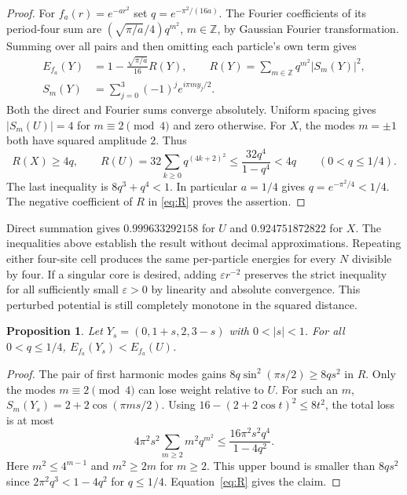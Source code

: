 \documentclass[11pt]{article}
\newtheorem{proposition}[theorem]{Proposition}
\newcommand{\Z}{\mathbb Z}
\begin{document}
\begin{proof}
For $f_a(r)=e^{-ar^2}$ set $q=e^{-\pi^2/(16a)}$. The Fourier coefficients of its period-four sum are $(\sqrt{\pi/a}/4)q^{m^2}$, $m\in\Z$, by Gaussian Fourier transformation. Summing over all pairs and then omitting each particle's own term gives
\begin{align}
 E_{f_a}(Y)&=1-\frac{\sqrt{\pi/a}}{16}R(Y),\qquad
 R(Y)=\sum_{m\in\Z}q^{m^2}|S_m(Y)|^2,\label{eq:R}\\
 S_m(Y)&=\sum_{j=0}^3(-1)^j e^{i\pi m y_j/2}.\nonumber
\end{align}
Both the direct and Fourier sums converge absolutely. Uniform spacing gives $|S_m(U)|=4$ for $m\equiv2\pmod4$ and zero otherwise. For $X$, the modes $m=\pm1$ both have squared amplitude $2$. Thus
\[
 R(X)\ge4q,\qquad R(U)=32\sum_{k\ge0}q^{(4k+2)^2}
          \le\frac{32q^4}{1-q^4}<4q\qquad(0<q\le1/4).
\]
The last inequality is $8q^3+q^4<1$. In particular $a=1/4$ gives $q=e^{-\pi^2/4}<1/4$. The negative coefficient of $R$ in \eqref{eq:R} proves the assertion.
\end{proof}

Direct summation gives $0.999633292158$ for $U$ and $0.924751872822$ for $X$. The inequalities above establish the result without decimal approximations. Repeating either four-site cell produces the same per-particle energies for every $N$ divisible by four. If a singular core is desired, adding $\varepsilon r^{-2}$ preserves the strict inequality for all sufficiently small $\varepsilon>0$ by linearity and absolute convergence. This perturbed potential is still completely monotone in the squared distance.

\begin{proposition}\label{prop:instability}
Let $Y_s=(0,1+s,2,3-s)$ with $0<|s|<1$. For all $0<q\le1/4$, $E_{f_a}(Y_s)<E_{f_a}(U)$.
\end{proposition}
\begin{proof}
The pair of first harmonic modes gains $8q\sin^2(\pi s/2)\ge8q s^2$ in $R$. Only the modes $m\equiv 2\pmod4$ can lose weight relative to $U$. For such an $m$, $S_m(Y_s)=2+2\cos(\pi ms/2)$. Using $16-(2+2\cos t)^2\le8t^2$, the total loss is at most
\[
  4\pi^2 s^2\sum_{m\ge2}m^2q^{m^2}
  \le \frac{16\pi^2 s^2q^4}{1-4q^2}.
\]
Here $m^2\le4^{m-1}$ and $m^2\ge2m$ for $m\ge2$. This upper bound is smaller than $8qs^2$ since $2\pi^2q^3<1-4q^2$ for $q\le1/4$. Equation~\eqref{eq:R} gives the claim.
\end{proof}
\end{document}
